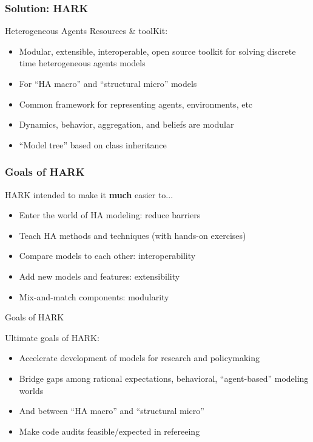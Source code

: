 \documentclass{beamer}
\newcommand{\bi}{\begin{itemize}}
\newcommand{\ei}{\end{itemize}}
\begin{document}
\begin{frame}
\frametitle{Solution: HARK}

\begin{block}{Heterogeneous Agents Resources \& toolKit:}
\bi
\item Modular, extensible, interoperable, open source toolkit for solving discrete time heterogeneous agents models

\item For ``HA macro'' and ``structural micro'' models

\item Common framework for representing agents, environments, etc 

\item Dynamics, behavior, aggregation, and beliefs are modular

\item ``Model tree'' based on class inheritance
\ei
\end{block}

\end{frame}


\begin{frame}
\frametitle{Goals of HARK}

\begin{block}{HARK intended to make it \textbf{much} easier to...}
  \bi
\item Enter the world of HA modeling: reduce barriers

\item Teach HA methods and techniques (with hands-on exercises)

\item Compare models to each other: interoperability

\item Add new models and features: extensibility

\item Mix-and-match components: modularity
  \ei
\end{block}

\end{frame}



\begin{frame}{Goals of HARK}

\begin{block}{Ultimate goals of HARK:}
\bi
\item Accelerate development of models for research and policymaking

\item Bridge gaps among rational expectations, behavioral, ``agent-based'' modeling worlds

\item And between ``HA macro'' and ``structural micro''

\item Make code audits feasible/expected in refereeing

\ei
\end{block}
\end{frame}
\end{document}
